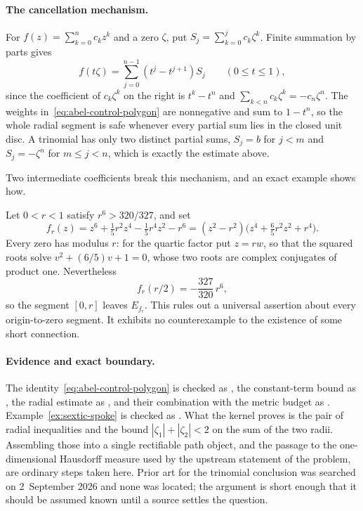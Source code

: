 \documentclass[11pt]{article}
\begin{document}
\paragraph{The cancellation mechanism.}
\label{subsec:abel-mechanism}
For $f(z)=\sum_{k=0}^nc_kz^k$ and a zero $\zeta$, put
$S_j=\sum_{k=0}^jc_k\zeta^k$.  Finite summation by parts gives
\begin{equation}\label{eq:abel-control-polygon}
 f(t\zeta)=\sum_{j=0}^{n-1}(t^j-t^{j+1})S_j\qquad(0\le t\le1),
\end{equation}
since the coefficient of $c_k\zeta^k$ on the right is $t^k-t^n$ and
$\sum_{k<n}c_k\zeta^k=-c_n\zeta^n$.  The weights
in~\eqref{eq:abel-control-polygon} are nonnegative and sum to $1-t^n$, so the
whole radial segment is safe whenever every partial sum lies in the closed
unit disc.  A trinomial has only two distinct partial sums, $S_j=b$ for $j<m$
and $S_j=-\zeta^n$ for $m\le j<n$, which is exactly the estimate above.

Two intermediate coefficients break this mechanism, and an exact example shows
how.

\begin{example}\label{ex:sextic-spoke}
Let $0<r<1$ satisfy $r^6>320/327$, and set
\[
 f_r(z)=z^6+\tfrac15r^2z^4-\tfrac15r^4z^2-r^6
       =(z^2-r^2)\bigl(z^4+\tfrac65r^2z^2+r^4\bigr).
\]
Every zero has modulus $r$: for the quartic factor put $z=rw$, so that the
squared roots solve $v^2+(6/5)v+1=0$, whose two roots are complex conjugates
of product one.  Nevertheless
\[
 f_r(r/2)=-\frac{327}{320}\,r^6,
\]
so the segment $[0,r]$ leaves $E_{f_r}$.  This rules out a universal assertion
about every origin-to-zero segment.  It exhibits no counterexample to the
existence of some short connection.
\end{example}

\paragraph{Evidence and exact boundary.}
\label{bdry:trinomial}
The identity~\eqref{eq:abel-control-polygon} is checked as
, the
constant-term bound as
,
the radial estimate as
,
and their combination with the metric budget as
.
Example~\ref{ex:sextic-spoke} is checked as
.  What the
kernel proves is the pair of radial inequalities and the bound
$|\zeta_1|+|\zeta_2|<2$ on the sum of the two radii.  Assembling those into a
single rectifiable path object, and the passage to the one-dimensional
Hausdorff measure used by the upstream statement of the problem, are ordinary
steps taken here.  Prior art for the trinomial conclusion was searched on
2~September 2026 and none was located; the argument is short enough that it
should be assumed known until a source settles the question.
\end{document}
